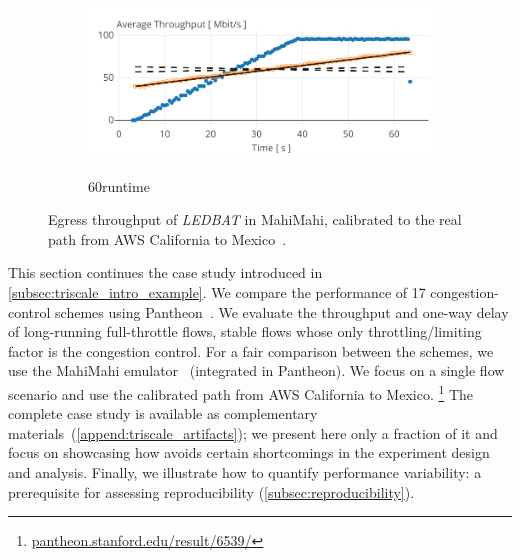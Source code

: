 \begin{figure}
    \begin{subfigure}[b]{\linewidth}
        \centering
       	\href{\triscalefig{Figure-4}}{
        \includegraphics[scale=1]{Figures/plot_ledbat_60_runtime.pdf}}
        \caption{60\s runtime}
        \label{fig:60s}
    \end{subfigure}
    \caption{Egress throughput of \textit{LEDBAT} in MahiMahi, calibrated to the real path from AWS California to Mexico~\cite{yan18pantheon}.
    }
    \label{fig:ledbat_convergence}
\end{figure}

This section continues the case study introduced in \cref{subsec:triscale_intro_example}.
We compare the performance of 17 congestion-control schemes using Pantheon~\cite{yan18pantheon}. We evaluate the throughput and one-way delay of long-running full-throttle flows, \ie stable flows whose only throttling/limiting factor is the congestion control.
For a fair comparison between the schemes, we use the MahiMahi emulator~\cite{netravali2015mahimahi} (integrated in Pantheon). We focus on a single flow scenario and use the calibrated path from AWS California to Mexico.%
\footnote{\href{https://pantheon.stanford.edu/result/6539/}{pantheon.stanford.edu/result/6539/}}
The complete case study is available as complementary materials~(\cref{append:triscale_artifacts});
we present here only a fraction of it and focus on showcasing how \triscale avoids certain shortcomings in the experiment design and analysis. Finally, we illustrate how to quantify performance variability: a prerequisite for assessing reproducibility (\cref{subsec:reproducibility}).

